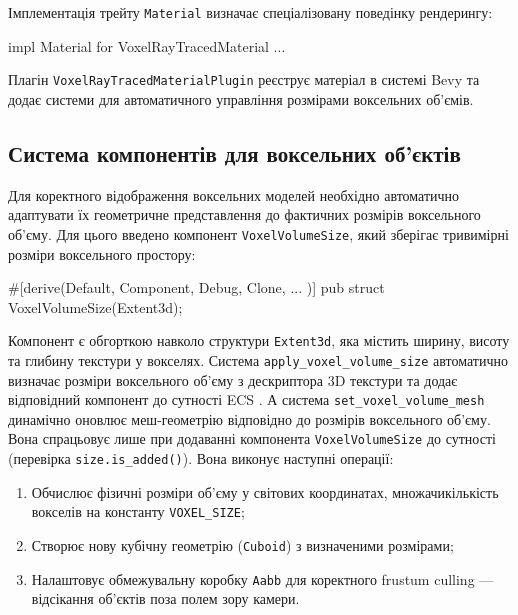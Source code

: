 Імплементація трейту \texttt{Material} визначає спеціалізовану поведінку рендерингу:

\begin{rustcode}
impl Material for VoxelRayTracedMaterial { ... }
\end{rustcode}

Плагін \texttt{VoxelRayTracedMaterialPlugin} реєструє матеріал в системі Bevy та додає системи для автоматичного управління розмірами воксельних об'ємів.

\subsection{Система компонентів для воксельних об'єктів}

Для коректного відображення воксельних моделей необхідно автоматично адаптувати їх геометричне представлення до фактичних розмірів воксельного об'єму. Для цього введено компонент \texttt{VoxelVolumeSize}, який зберігає тривимірні розміри воксельного простору:

\begin{rustcode}
#[derive(Default, Component, Debug, Clone, ... )]
pub struct VoxelVolumeSize(Extent3d);
\end{rustcode}

Компонент є обгорткою навколо структури \texttt{Extent3d}, яка містить ширину, висоту та глибину текстури у вокселях. Система \texttt{apply\_voxel\_volume\_size} автоматично визначає розміри воксельного об'єму з дескриптора 3D текстури та додає відповідний компонент до сутності ECS . А система \texttt{set\_voxel\_volume\_mesh} динамічно оновлює меш-геометрію відповідно до розмірів воксельного об'єму. Вона спрацьовує лише при додаванні компонента \texttt{VoxelVolumeSize} до сутності (перевірка \texttt{size.is\_added()}). Вона виконує наступні операції:

\begin{enumerate}[itemsep=0pt, topsep=0pt]
    \item Обчислює фізичні розміри об'єму у світових координатах, множачи\newline кількість вокселів на константу \texttt{VOXEL\_SIZE};
    \item Створює нову кубічну геометрію (\texttt{Cuboid}) з визначеними розмірами;
    \item Налаштовує обмежувальну коробку \texttt{Aabb}  для коректного frustum culling --- відсікання об'єктів поза полем зору камери.
\end{enumerate}

